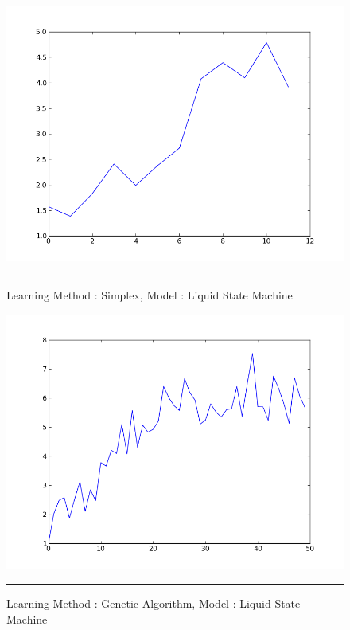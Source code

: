 \begin{figure}[htbp]
    \centering
    \includegraphics[scale=0.5]{Figures/esn_simplex.png}
    \rule{35em}{0.5pt}
    \caption[Learning Method : Simplex, Model : LMS]{Learning Method : Simplex, Model : Liquid State Machine}
    \label{fig:esn_simplex}
\end{figure}

\begin{figure}[htbp]
    \centering
    \includegraphics[scale=0.5]{Figures/esn_gen.png}
    \rule{35em}{0.5pt}
    \caption[Learning Method : GA, Model : Liquid State Machine]{Learning Method : Genetic Algorithm, Model : Liquid State Machine}
    \label{fig:esn_gen}
\end{figure}


